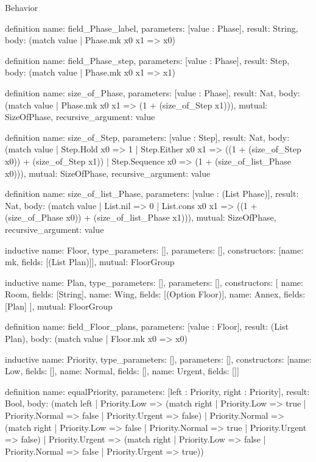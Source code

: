 \begin{lexlean}{Behavior}
\begin{semanticmodule}
definition{
  name: field_Phase_label,
  parameters: [value : Phase],
  result: String,
  body: (match value | Phase.mk x0 x1 => x0)
}

definition{
  name: field_Phase_step,
  parameters: [value : Phase],
  result: Step,
  body: (match value | Phase.mk x0 x1 => x1)
}

definition{
  name: size_of_Phase,
  parameters: [value : Phase],
  result: Nat,
  body: (match value | Phase.mk x0 x1 => (1 + (size_of_Step x1))),
  mutual: SizeOfPhase,
  recursive_argument: value
}

definition{
  name: size_of_Step,
  parameters: [value : Step],
  result: Nat,
  body: (match value
    | Step.Hold x0 => 1
    | Step.Either x0 x1 => ((1 + (size_of_Step x0)) + (size_of_Step x1))
    | Step.Sequence x0 => (1 + (size_of_list_Phase x0))),
  mutual: SizeOfPhase,
  recursive_argument: value
}

definition{
  name: size_of_list_Phase,
  parameters: [value : (List Phase)],
  result: Nat,
  body: (match value
    | List.nil => 0
    | List.cons x0 x1 => ((1 + (size_of_Phase x0)) + (size_of_list_Phase x1))),
  mutual: SizeOfPhase,
  recursive_argument: value
}

inductive{
  name: Floor,
  type_parameters: [],
  parameters: [],
  constructors: [{name: mk, fields: [(List Plan)]}],
  mutual: FloorGroup
}

inductive{
  name: Plan,
  type_parameters: [],
  parameters: [],
  constructors: [
    {name: Room, fields: [String]},
    {name: Wing, fields: [(Option Floor)]},
    {name: Annex, fields: [Plan]}
  ],
  mutual: FloorGroup
}

definition{
  name: field_Floor_plans,
  parameters: [value : Floor],
  result: (List Plan),
  body: (match value | Floor.mk x0 => x0)
}

inductive{
  name: Priority,
  type_parameters: [],
  parameters: [],
  constructors: [{name: Low, fields: []}, {name: Normal, fields: []}, {name: Urgent, fields: []}]
}

definition{
  name: equalPriority,
  parameters: [left : Priority, right : Priority],
  result: Bool,
  body: (match left
    | Priority.Low => (match right
      | Priority.Low => true
      | Priority.Normal => false
      | Priority.Urgent => false)
    | Priority.Normal => (match right
      | Priority.Low => false
      | Priority.Normal => true
      | Priority.Urgent => false)
    | Priority.Urgent => (match right
      | Priority.Low => false
      | Priority.Normal => false
      | Priority.Urgent => true))
}


\end{semanticmodule}
\end{lexlean}
